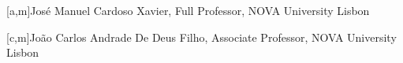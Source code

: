 


[a,m]{José Manuel Cardoso Xavier, Full Professor, NOVA University Lisbon}

[c,m]{João Carlos Andrade De Deus Filho, Associate Professor, NOVA University Lisbon}


